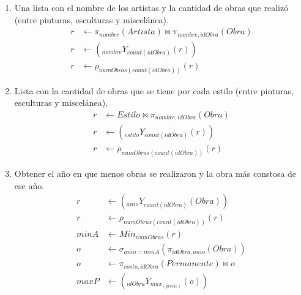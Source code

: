\documentclass{article}
\begin{document}
\begin{enumerate}
{\begin{enumerate}
{\begin{align*}
                        r &\leftarrow \pi_{nombre, pais}(Artista) \bowtie r \\
                        r &\leftarrow Obra \bowtie r
                    \end{align*}
                }
                \item {
                    Una lista con el nombre de los artistas y la cantidad de
                    obras que realizó (entre pinturas, esculturas y miscelánea).
                    \begin{align*}
                        r &\leftarrow \pi_{nombre}(Artista) \bowtie \pi_{nombre, 
                        idObra}(Obra) \\
                        r &\leftarrow (_{nombre}Y_{count(idObra)}(r)) \\
                        r &\leftarrow \rho_{numObras(count(idObra))}(r)
                    \end{align*}
                }
                \item {
                    Lista con la cantidad de obras que se tiene por cada estilo
                    (entre pinturas, esculturas y miscelánea).
                    \begin{align*}
                        r &\leftarrow Estilo \bowtie \pi_{nombre, idObra}(Obra) \\
                        r &\leftarrow (_{estilo}Y_{count(idObra)}(r)) \\
                        r &\leftarrow \rho_{numObras(count(idObra))}(r)
                    \end{align*}
                }
                \item {
                    Obtener el año en que menos obras se realizaron y la obra más
                    constosa de ese año.
                    \begin{align*}
                        r &\leftarrow (_{anio}Y_{count(idObra)}(Obra)) \\
                        r &\leftarrow \rho_{numObras(count(idObra))}(r) \\
                        minA &\leftarrow Min_{numObras}(r) \\
                        o &\leftarrow \sigma_{anio = minA}(\pi_{idObra, anio}(Obra)) \\
                        o &\leftarrow \pi_{costo, idObra}(Permanente) \bowtie o \\
                        maxP &\leftarrow (_{idObra}Y_{max_(precio)}(o)) \\

\end{align*}}
\end{enumerate}}
\end{enumerate}
\end{document}
